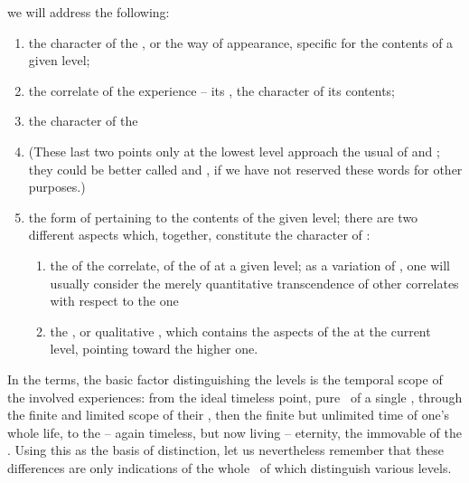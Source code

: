 we will address the following: 
\begin{enumerate}\MyLPar
\item\label{as:sig} the character of the , or the way of
 appearance, specific for the contents of a given level;
\item\label{as:cor} the correlate of the experience -- its , 
  the character of its contents; 
\item\label{as:sub} the character of the 
\item[{}](These last two 
  points only at the lowest level approach the usual  of
   and ; they could be better called  and
  , if we have not reserved these words for other purposes.)
\item\label{as:tra} the form of  pertaining to the contents of
the given level;
there are two different aspects which, together, 
constitute the character of :
\begin{enumerate}%
\item the  of the correlate, of the  of  at a given level; as a variation of , one will usually 
consider the merely quantitative transcendence of other correlates with
respect to the  one
\item the , or qualitative , which contains the 
 aspects of the  at the current level,  
pointing toward the higher one. 
\end{enumerate}
\end{enumerate}
In the  terms, the basic factor distinguishing the levels is the
temporal scope of the involved experiences: from the ideal timeless point, pure
\herenow\ of a single , through the finite and limited scope of their
, then the finite but unlimited time of one's whole life,
to the -- again timeless, but now living -- eternity, the immovable  of the
. Using this as the basis of distinction, let us nevertheless
remember that these differences are only indications of the whole \nexuss\ of
 which distinguish various levels.


